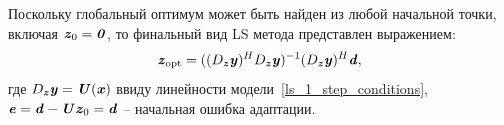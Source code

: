 Поскольку глобальный оптимум может быть найден из любой начальной точки, включая $\textbf{\textit{z}}_0=\textbf{\textit{0}}$, то финальный вид LS метода представлен выражением:
\begin{equation}
	\textbf{\textit{z}}_{\text{opt}}=((D_{\textbf{\textit{z}}}\textbf{\textit{y}})^HD_{\textbf{\textit{z}}}\textbf{\textit{y}})^{-1}(D_{\textbf{\textit{z}}}\textbf{\textit{y}})^H\textbf{\textit{d}},
	\label{ls_eq_jac}
\end{equation}
где $D_{\textbf{\textit{z}}}\textbf{\textit{y}}=\textbf{\textit{U}}(\textbf{\textit{x}})$ ввиду линейности модели~\eqref{ls_1_step_conditions}, $\textbf{\textit{e}}=\textbf{\textit{d}}-\textbf{\textit{U}}\textbf{\textit{z}}_0=\textbf{\textit{d}}$ -- начальная ошибка адаптации.


%
%
